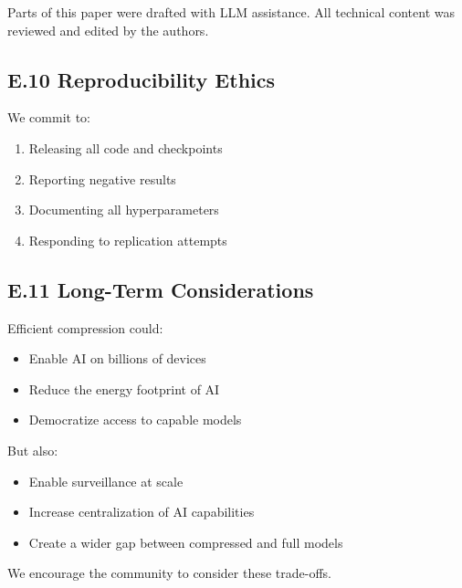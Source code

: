 Parts of this paper were drafted with LLM assistance. All technical content 
was reviewed and edited by the authors.

\subsection{E.10 Reproducibility Ethics}

We commit to:

\begin{enumerate}
\item Releasing all code and checkpoints
\item Reporting negative results
\item Documenting all hyperparameters
\item Responding to replication attempts

\end{enumerate}
\subsection{E.11 Long-Term Considerations}

Efficient compression could:

\begin{itemize}
\item Enable AI on billions of devices
\item Reduce the energy footprint of AI
\item Democratize access to capable models

\end{itemize}
But also:

\begin{itemize}
\item Enable surveillance at scale
\item Increase centralization of AI capabilities
\item Create a wider gap between compressed and full models

\end{itemize}
We encourage the community to consider these trade-offs.